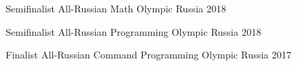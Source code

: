 









\begin{cvhonors}

  \cvhonor
    {Semifinalist} %
    {All-Russian Math Olympic} %
    {Russia} %
    {2018} %

  \cvhonor
    {Semifinalist} %
    {All-Russian Programming Olympic} %
    {Russia} %
    {2018} %

  \cvhonor
    {Finalist} %
    {All-Russian Command Programming Olympic} %
    {Russia} %
    {2017} %

\end{cvhonors}
